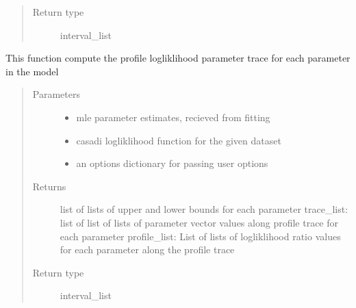 \documentclass[letterpaper,10pt,english,openany,oneside]{sphinxmanual}
\begin{document}
\begin{fulllineitems}
\begin{fulllineitems}
\begin{quote}
\begin{description}
\item[{Return type}] \leavevmode
interval\_list

\end{description}\end{quote}

\end{fulllineitems}


\begin{fulllineitems}
\label{\detokenize{nloed:nloed.model.Model.__profiletrace}}
This function compute the profile logliklihood parameter trace for each parameter in the model
\begin{quote}\begin{description}
\item[{Parameters}] \leavevmode\begin{itemize}
\item {} 
 \textendash{} mle parameter estimates,  recieved from fitting

\item {} 
 \textendash{} casadi logliklihood function for the given dataset

\item {} 
 \textendash{} an options dictionary for passing user options

\end{itemize}

\item[{Returns}] \leavevmode
list of lists of upper and lower bounds for each parameter
trace\_list: list of list of lists of parameter vector values along profile trace for each parameter
profile\_list: List of lists of logliklihood ratio values for each parameter along the profile trace

\item[{Return type}] \leavevmode
interval\_list

\end{description}\end{quote}

\end{fulllineitems}


\end{fulllineitems}
\end{document}
